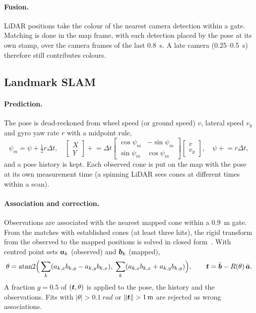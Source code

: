 \documentclass[11pt]{article}
\begin{document}
\paragraph{Fusion.} LiDAR positions take the colour of the nearest camera detection within a gate. Matching is done
in the map frame, with each detection placed by the pose at its own stamp, over the camera frames of the last
\SI{0.8}{s}. A late camera (0.25--\SI{0.5}{s}) therefore still contributes colours.

\subsection{Landmark SLAM}
\paragraph{Prediction.} The pose is dead-reckoned from wheel speed (or ground speed) $v$, lateral speed $v_y$ and
gyro yaw rate $r$ with a midpoint rule,
\begin{equation}
\psi_m = \psi + \tfrac12 r\Delta t,\quad
\begin{bmatrix}X\\Y\end{bmatrix} \mathrel{+}= \Delta t\begin{bmatrix}\cos\psi_m & -\sin\psi_m\\ \sin\psi_m & \cos\psi_m\end{bmatrix}\begin{bmatrix}v\\ v_y\end{bmatrix},\quad
\psi \mathrel{+}= r\Delta t,
\end{equation}
and a pose history is kept. Each observed cone is put on the map with the pose at its own measurement time (a
spinning LiDAR sees cones at different times within a scan).

\paragraph{Association and correction.} Observations are associated with the nearest mapped cone within a
\SI{0.9}{m} gate. From the matches with established cones (at least three hits), the rigid transform from the
observed to the mapped positions is solved in closed form~\cite{kabsch1976}. With centred point sets $\bm{a}_k$
(observed) and $\bm{b}_k$ (mapped),
\begin{equation}
\theta = \operatorname{atan2}\!\Big(\sum_k (a_{k,x}b_{k,y} - a_{k,y}b_{k,x}),\;\sum_k (a_{k,x}b_{k,x} + a_{k,y}b_{k,y})\Big),\qquad
\bm{t} = \bar{\bm{b}} - R(\theta)\,\bar{\bm{a}}.
\end{equation}
A fraction $g=0.5$ of $(\bm{t},\theta)$ is applied to the pose, the history and the observations. Fits with
$|\theta|>\SI{0.1}{rad}$ or $\lVert\bm{t}\rVert>\SI{1}{m}$ are rejected as wrong associations.
\end{document}
